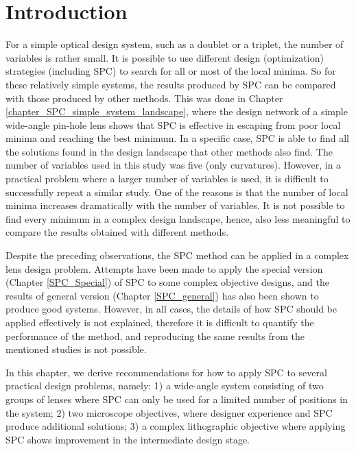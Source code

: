 \section{Introduction}
For a simple optical design system, such as a doublet or a triplet, the number of variables is rather small. It is possible to use different design (optimization) strategies (including SPC) to search for all or most of the local minima. So for these relatively simple systems, the results produced by SPC can be compared with those produced by other methods. This was done in Chapter \ref{chapter_SPC_simple_system_landscape}, where the design network of a simple wide-angle pin-hole lens \cite{HouSimple16} shows that SPC is effective in escaping from poor local minima and reaching the best minimum. In a specific case, SPC is able to find all the solutions found in the design landscape that other methods also find. The number of variables used in this study was five (only curvatures). However, in a practical problem where a larger number of variables is used, it is difficult to successfully repeat a similar study. One of the reasons is that the number of local minima increases dramatically with the number of variables. It is not possible to find every minimum in a complex design landscape, hence, also less meaningful to compare the results obtained with different methods.  

Despite the preceding observations, the SPC method can be applied in a complex lens design problem. Attempts have been made to apply the special version (Chapter \ref{SPC_Special}) of SPC to some complex objective designs\cite{OanaOEngPart2}\cite{CaoCatadioptricwithSPCOeng2017}, and the results of general version (Chapter \ref{SPC_general}) has also been shown to produce good systems\cite{LivshitsSP2014}. However, in all cases, the details of how SPC should be applied effectively is not explained, therefore it is difficult to quantify the performance of the method, and reproducing the same results from the mentioned studies is not possible. 

In this chapter, we derive recommendations for how to apply SPC to several practical design problems, namely: 1) a wide-angle system consisting of two groups of lenses where SPC can only be used for a limited number of positions in the system; 2) two microscope objectives, where designer experience and SPC produce additional solutions; 3) a complex lithographic objective where applying SPC shows improvement in the intermediate design stage. 


